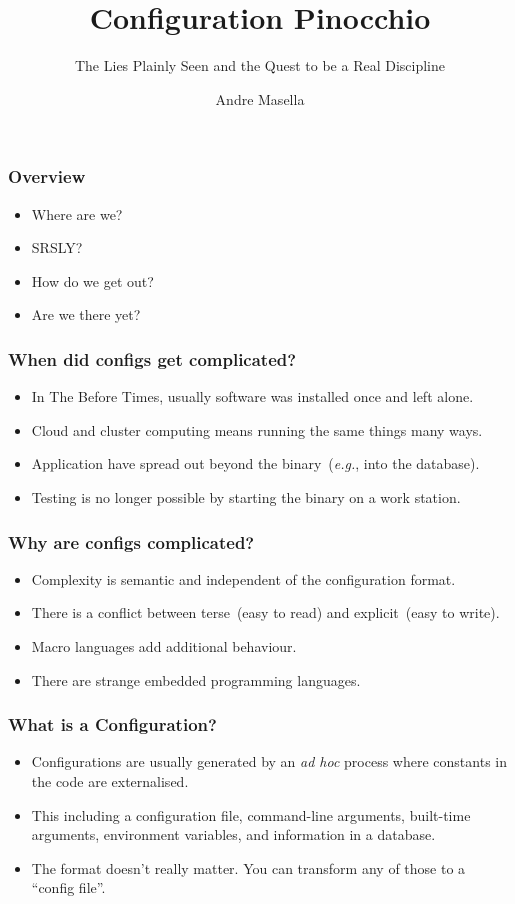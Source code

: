 \documentclass{beamer}
\title{Configuration Pinocchio}
\subtitle{The Lies Plainly Seen and the Quest to be a Real Discipline}
\author{Andre Masella}
\begin{document}
\begin{frame}\maketitle \end{frame}

\begin{frame}\frametitle{Overview}
\begin{itemize}
\item Where are we?
\item SRSLY?
\item How do we get out?
\item Are we there yet?
\end{itemize}
\end{frame}

\begin{frame}\frametitle{When did configs get complicated?}
\begin{itemize}
\item In The Before Times, usually software was installed once and left alone.
\item Cloud and cluster computing means running the same things many ways.
\item Application have spread out beyond the binary~(\emph{e.g.}, into the database).
\item Testing is no longer possible by starting the binary on a work station.
\end{itemize}
\end{frame}

\begin{frame}\frametitle{Why are configs complicated?}
\begin{itemize}
\item Complexity is semantic and independent of the configuration format.
\item There is a conflict between terse~(easy to read) and explicit~(easy to write).
\item Macro languages add additional behaviour.
\item There are strange embedded programming languages.
\end{itemize}
\end{frame}

\begin{frame}\frametitle{What is a Configuration?}
\begin{itemize}
\item Configurations are usually generated by an \emph{ad hoc} process where constants in the code are externalised.
\item This including a configuration file, command-line arguments, built-time arguments, environment variables, and information in a database.
\item The format doesn't really matter. You can transform any of those to a ``config file''.
\end{itemize}
\end{frame}
\end{document}
